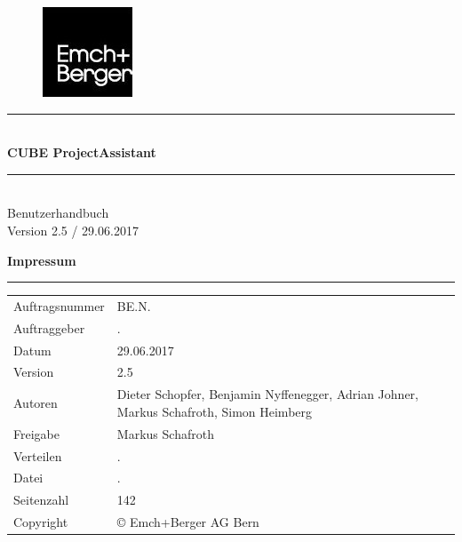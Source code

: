 \documentclass[12pt]{article} %
\newcommand{\HRule}{\rule{\linewidth}{0.5mm}} %
\begin{document}

\begin{titlepage}


\begin{figure}[t] %
\flushright  %
\includegraphics[width=0.2\linewidth]{0_EmBeLogo}
\end{figure}

\vspace*{6cm}

\center %

\HRule \\[0.4cm]
{ \huge \bfseries CUBE ProjectAssistant}\\[0.4cm] %
\HRule \\[1.5cm]

\textsf{\Large Benutzerhandbuch}\\[0.5cm] %
\textsf{\large Version 2.5 / 29.06.2017}\\[0.5cm] %

\pagebreak
\vspace*{15cm}

\flushleft\textbf{ Impressum}
\rule{\textwidth}{1pt}

\begin{tabular}{lp{12cm}}
Auftragsnummer & BE.N.\\
Auftraggeber & .\\
Datum & 29.06.2017\\
Version & 2.5\\
Autoren & Dieter Schopfer, Benjamin Nyffenegger, Adrian Johner, Markus Schafroth, Simon Heimberg\\
Freigabe & Markus Schafroth\\
Verteilen & .\\
Datei & .\\
Seitenzahl & 142\\
Copyright & \copyright{ Emch+Berger AG Bern}\\
\end{tabular}


\end{titlepage}
\end{document}
